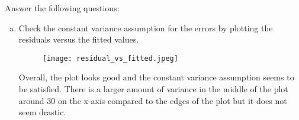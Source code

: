 \documentclass[12pt,letterpaper]{article}
\begin{document}
\vspace{.5cm}
  
\vspace{.5cm}
Answer the following questions:
\vspace{.5cm}
\begin{enumerate}[(a)]
	 \item Check the constant variance assumption for the errors by plotting the residuals versus the fitted values. \newpage
\vspace{1cm}
 
\begin{figure} [H]
	\texttt{[image: residual\_vs\_fitted.jpeg]}
\end{figure}
\vspace{1cm}
\noindent Overall, the plot looks good and the constant variance assumption seems to be satisfied. There is a larger amount of variance in the middle of the plot around 30 on the x-axis compared to the edges of the plot but it does not seem drastic.
\vspace{3cm}


\end{enumerate}
\end{document}
